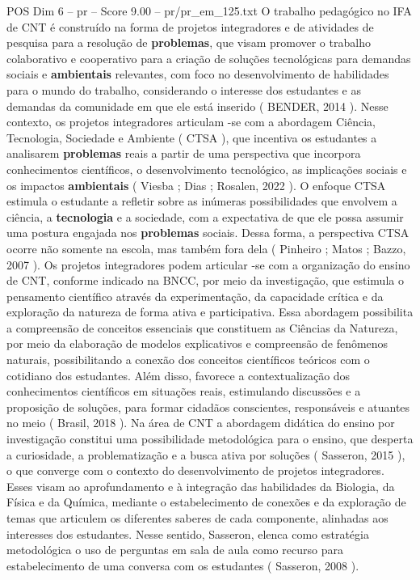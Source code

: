 \begin{textsample}{POS Dim 6 – pr – Score 9.00 – pr/pr\_em\_125.txt}
O trabalho pedagógico no IFA de CNT é construído na forma de projetos integradores e de atividades de pesquisa para a resolução de \textbf{problemas}, que visam promover o trabalho colaborativo e cooperativo para a criação de soluções tecnológicas para demandas sociais e \textbf{ambientais} relevantes, com foco no desenvolvimento de habilidades para o mundo do trabalho, considerando o interesse dos estudantes e as demandas da comunidade em que ele está inserido ( BENDER, 2014 ).
Nesse contexto, os projetos integradores articulam -se com a abordagem Ciência, Tecnologia, Sociedade e Ambiente ( CTSA ), que incentiva os estudantes a analisarem \textbf{problemas} reais a partir de uma perspectiva que incorpora conhecimentos científicos, o desenvolvimento tecnológico, as implicações sociais e os impactos \textbf{ambientais} ( Viesba ; Dias ; Rosalen, 2022 ).
O enfoque CTSA estimula o estudante a refletir sobre as inúmeras possibilidades que envolvem a ciência, a \textbf{tecnologia} e a sociedade, com a expectativa de que ele possa assumir uma postura engajada nos \textbf{problemas} sociais.
Dessa forma, a perspectiva CTSA ocorre não somente na escola, mas também fora dela ( Pinheiro ; Matos ; Bazzo, 2007 ).
Os projetos integradores podem articular -se com a organização do ensino de CNT, conforme indicado na BNCC, por meio da investigação, que estimula o pensamento científico através da experimentação, da capacidade crítica e da exploração da natureza de forma ativa e participativa.
Essa abordagem possibilita a compreensão de conceitos essenciais que constituem as Ciências da Natureza, por meio da elaboração de modelos explicativos e compreensão de fenômenos naturais, possibilitando a conexão dos conceitos científicos teóricos com o cotidiano dos estudantes.
Além disso, favorece a contextualização dos conhecimentos científicos em situações reais, estimulando discussões e a proposição de soluções, para formar cidadãos conscientes, responsáveis e atuantes no meio ( Brasil, 2018 ).
Na área de CNT a abordagem didática do ensino por investigação constitui uma possibilidade metodológica para o ensino, que desperta a curiosidade, a problematização e a busca ativa por soluções ( Sasseron, 2015 ), o que converge com o contexto do desenvolvimento de projetos integradores.
Esses visam ao aprofundamento e à integração das habilidades da Biologia, da Física e da Química, mediante o estabelecimento de conexões e da exploração de temas que articulem os diferentes saberes de cada componente, alinhadas aos interesses dos estudantes.
Nesse sentido, Sasseron, elenca como estratégia metodológica o uso de perguntas em sala de aula como recurso para estabelecimento de uma conversa com os estudantes ( Sasseron, 2008 ).

\end{textsample}
